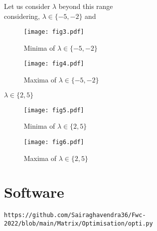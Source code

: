 \documentclass[journal,12pt,twocolumn]{IEEEtran}
\begin{document}
Let us consider $\lambda$ beyond this range  \\
considering, $\lambda \in \{-5,-2\}$ and
\begin{figure}
\texttt{[image: fig3.pdf]}
\caption{Minima of $\lambda \in \{-5,-2\}$}
\label{fig:Figure}
\texttt{[image: fig4.pdf]}
\caption{Maxima of $\lambda \in \{-5,-2\}$}
\label{fig:Figure}
\end{figure}
$\lambda \in \{2,5\}$
\begin{figure}
\texttt{[image: fig5.pdf]}
\caption{Minima of $\lambda \in \{2,5\}$}
\label{fig:Figure}
\texttt{[image: fig6.pdf]}
\caption{Maxima of $\lambda \in \{2,5\}$}
\label{fig:Figure}
\end{figure}

\section{\textbf{Software}}
\begin{lstlisting}
https://github.com/Sairaghavendra36/Fwc-2022/blob/main/Matrix/Optimisation/opti.py
\end{lstlisting}
\end{document}
